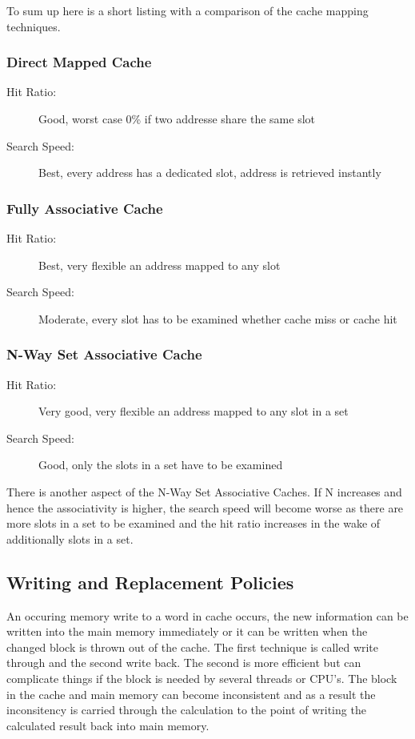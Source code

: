 \documentclass[DIV10, abstracton, openright, footsepline, headsepline, twoside, 9pt,
bigheadings]{scrreprt}
\begin{document}
To sum up here is a short listing with a comparison of the cache mapping
techniques.
\subsubsection*{Direct Mapped Cache}
\begin{description}
\item[Hit Ratio:] Good, worst case 0\% if two addresse share the same slot
\item[Search Speed:] Best, every address has a dedicated slot, address is
retrieved instantly
\end{description}

\subsubsection*{Fully Associative Cache}
\begin{description}
\item[Hit Ratio:] Best, very flexible an address mapped to any slot
\item[Search Speed:] Moderate, every slot has to be examined whether cache miss
or cache hit
\end{description}

\subsubsection*{N-Way Set Associative Cache}
\begin{description}
\item[Hit Ratio:] Very good, very flexible an address mapped to any slot in a
set
\item[Search Speed:] Good, only the slots in a set have to be examined
\end{description}

There is another aspect of the N-Way Set Associative Caches. If N increases and
hence the associativity is higher, the search speed will become worse as there
are more slots in a set to be examined and the hit ratio increases in the wake of
additionally slots in a set.

\subsection{Writing and Replacement Policies}
\label{sec:wrrdpolicies}
An occuring memory write to a word in cache occurs, the new information can be
written into the main memory immediately or it can be written when the changed
block is thrown out of the cache. The first technique is called write through and
the second write back. The second is more efficient but can complicate things if
the block is needed by several threads or CPU's. The block in the cache and main
memory can become inconsistent and as a result the inconsitency is carried
through the calculation to the point of writing the calculated result back into
main memory.
\end{document}
